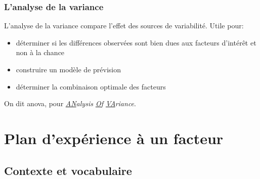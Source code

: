 \documentclass{BeamerTemplate}
\begin{document}
\begin{frame}[t]
 \frametitle{L'analyse de la variance}

\alert{L'analyse de la variance}  compare l'effet des sources de variabilité. Utile pour:


\begin{itemize}\itemsep2mm
\item déterminer si les différences observées sont bien dues aux facteurs d'intérêt et non à la chance
\item construire un modèle de prévision
\item déterminer la combinaison optimale des facteurs
\end{itemize}

\medskip
On dit  \alert{anova}, pour {\it \underline{AN}alysis \underline{O}f \underline{VA}riance}.
\end{frame}


\section[Plan 1 facteur]{Plan d'expérience à un facteur}\label{sec:1fac}

\subsection{Contexte et vocabulaire}
\end{document}
